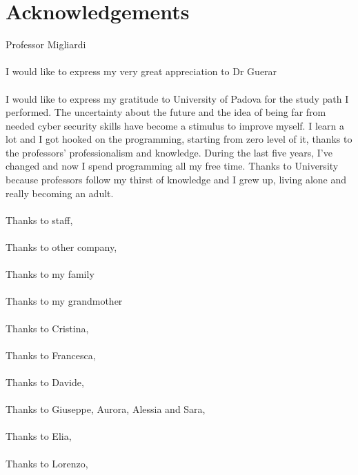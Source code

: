 \chapter*{Acknowledgements}
Professor Migliardi\\\\
I would like to express my very great appreciation to Dr Guerar\\\\
I would like to express my gratitude to University of Padova for the study path I performed. The uncertainty about the future and the idea of being far from needed cyber security skills have become a stimulus to improve myself. I learn a lot and I got hooked on the programming, starting from zero level of it, thanks to the professors' professionalism and knowledge. During the last five years, I've changed and now I spend programming all my free time. Thanks to University because professors follow my thirst of knowledge and I grew up, living alone and really becoming an adult.\\\\
Thanks to staff,\\\\
Thanks to other company,\\\\
Thanks to my family\\\\
Thanks to my grandmother\\\\
Thanks to Cristina,\\\\
Thanks to Francesca,\\\\
Thanks to Davide,\\\\
Thanks to Giuseppe, Aurora, Alessia and Sara,\\\\
Thanks to Elia,\\\\
Thanks to Lorenzo,\\\\